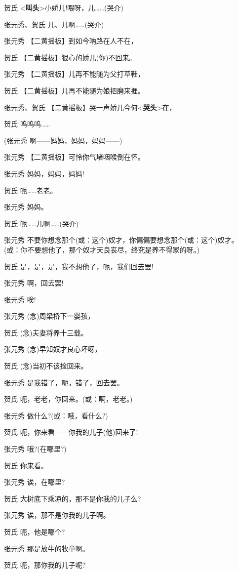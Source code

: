 贺氏
\textless{}\textbf{叫头}\textgreater{}小娇儿!喂呀，儿\ldots{}\ldots{}(哭介)

张元秀、贺氏 儿、儿啊\ldots{}\ldots{}(哭介)

张元秀 【二黄摇板】到如今呐路在人不在，

贺氏 【二黄摇板】狠心的娇儿(你)不回来。

张元秀 【二黄摇板】儿再不能随为父打草鞋，

贺氏 【二黄摇板】儿再不能随为娘把磨来捱。

张元秀、贺氏
【二黄摇板】哭一声娇儿今何\textless{}\textbf{哭头}\textgreater{}在，

贺氏 呜呜呜\ldots{}\ldots{}

(张元秀 啊------妈妈，妈妈，妈妈------)

张元秀 【二黄摇板】可怜你气堵咽喉倒在怀。

张元秀 妈妈，妈妈，妈妈!

贺氏 呃\ldots{}\ldots{}老老。

张元秀 妈妈。

贺氏 呃\ldots{}\ldots{}儿啊\ldots{}\ldots{}(哭介)

张元秀
不要你想念那个(或：这个)奴才，你偏偏要想念那个(或：这个)奴才。(或：你不要想他了，那个奴才天良丧尽，终究是养不得家的呀。)

贺氏 是，是，是，我不想他了，呃，我们回去罢!

张元秀 啊，回去罢!

张元秀 唉!

张元秀 (念)周梁桥下一婴孩，

贺氏 (念)夫妻将养十三载。

张元秀 (念)早知奴才良心坏呀，

贺氏 (念)当初不该捡回来。

张元秀 是我错了，呃，错了，回去罢。

贺氏 呃，老老，你回来。(或：啊，老老。)

张元秀 做什么?(或：哦，看什么?)

贺氏 呃，你来看------你我的儿子(他)回来了!

张元秀 哦?(在哪里?)

贺氏 你来看。

张元秀 诶，在哪里?

贺氏 大树底下乘凉的，那不是你我的儿子么?

张元秀 诶，那不是你我的儿子啊。

贺氏 呃，他是哪个?

张元秀 那是放牛的牧童啊。

贺氏 呃，那你我的儿子呢?

